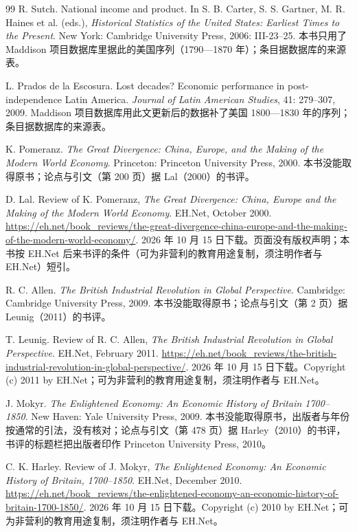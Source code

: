 \begin{thebibliography}{99}
 R. Sutch. National income and product. In S. B. Carter, S. S. Gartner, M. R. Haines et al. (eds.), \emph{Historical Statistics of the United States: Earliest Times to the Present}. New York: Cambridge University Press, 2006: III-23--25. 本书只用了 Maddison 项目数据库里据此的美国序列（1790—1870 年）；条目据数据库的来源表。

 L. Prados de la Escosura. Lost decades? Economic performance in post-independence Latin America. \emph{Journal of Latin American Studies}, 41: 279--307, 2009. Maddison 项目数据库用此文更新后的数据补了美国 1800—1830 年的序列；条目据数据库的来源表。

 K. Pomeranz. \emph{The Great Divergence: China, Europe, and the Making of the Modern World Economy}. Princeton: Princeton University Press, 2000. 本书没能取得原书；论点与引文（第 200 页）据 Lal（2000）的书评。

 D. Lal. Review of K. Pomeranz, \emph{The Great Divergence: China, Europe and the Making of the Modern World Economy}. EH.Net, October 2000. \url{https://eh.net/book_reviews/the-great-divergence-china-europe-and-the-making-of-the-modern-world-economy/}. 2026 年 10 月 15 日下载。页面没有版权声明；本书按 EH.Net 后来书评的条件（可为非营利的教育用途复制，须注明作者与 EH.Net）短引。

 R. C. Allen. \emph{The British Industrial Revolution in Global Perspective}. Cambridge: Cambridge University Press, 2009. 本书没能取得原书；论点与引文（第 2 页）据 Leunig（2011）的书评。

 T. Leunig. Review of R. C. Allen, \emph{The British Industrial Revolution in Global Perspective}. EH.Net, February 2011. \url{https://eh.net/book_reviews/the-british-industrial-revolution-in-global-perspective/}. 2026 年 10 月 15 日下载。Copyright (c) 2011 by EH.Net；可为非营利的教育用途复制，须注明作者与 EH.Net。

 J. Mokyr. \emph{The Enlightened Economy: An Economic History of Britain 1700--1850}. New Haven: Yale University Press, 2009. 本书没能取得原书，出版者与年份按通常的引法，没有核对；论点与引文（第 478 页）据 Harley（2010）的书评，书评的标题栏把出版者印作 Princeton University Press, 2010。

 C. K. Harley. Review of J. Mokyr, \emph{The Enlightened Economy: An Economic History of Britain, 1700--1850}. EH.Net, December 2010. \url{https://eh.net/book_reviews/the-enlightened-economy-an-economic-history-of-britain-1700-1850/}. 2026 年 10 月 15 日下载。Copyright (c) 2010 by EH.Net；可为非营利的教育用途复制，须注明作者与 EH.Net。


\end{thebibliography}
